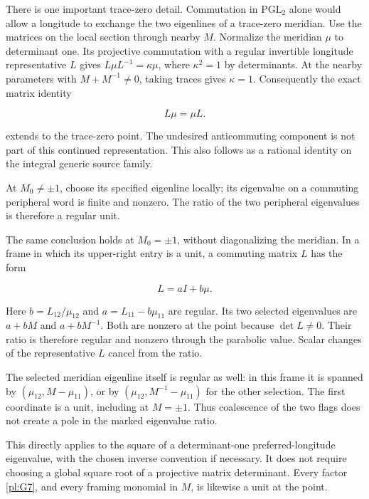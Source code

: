 There is one important trace-zero detail. Commutation in
\(\mathrm{PGL}_2\) alone would allow a longitude to
exchange the two eigenlines of a trace-zero meridian.
Use the matrices on the local section through nearby \(M\).
Normalize the meridian \(\mu\) to determinant one.
Its projective commutation with a regular invertible
longitude representative \(L\) gives
\(L\mu L^{-1}=\kappa\mu\), where
\(\kappa^2=1\) by determinants. At the nearby parameters
with \(M+M^{-1}\ne0\), taking traces gives \(\kappa=1\).
Consequently the exact matrix identity

\begin{equation}\label{pl:G16a}
L\mu=\mu L.
\end{equation}

extends to the trace-zero point. The undesired
anticommuting component is not part of this continued
representation. This also follows as a rational identity
on the integral generic source family.

At \(M_0\ne\pm1\), choose
its specified eigenline locally; its eigenvalue on a commuting
peripheral word is finite and nonzero. The ratio of the two
peripheral eigenvalues is therefore a regular unit.

The same conclusion holds at \(M_0=\pm1\), without
diagonalizing the meridian. In a frame in which its
upper-right entry is a unit, a commuting matrix \(L\) has
the form

\begin{equation}\label{pl:G17}
L=aI+b\mu.
\end{equation}

Here \(b=L_{12}/\mu_{12}\) and
\(a=L_{11}-b\mu_{11}\) are regular. Its two selected
eigenvalues are \(a+bM\) and \(a+bM^{-1}\). Both are
nonzero at the point because \(\det L\ne0\).
Their ratio is therefore regular and nonzero through the
parabolic value. Scalar changes of the representative \(L\)
cancel from the ratio.

The selected meridian eigenline itself is regular as well:
in this frame it is spanned by
\((\mu_{12},M-\mu_{11})\), or by
\((\mu_{12},M^{-1}-\mu_{11})\) for the other selection.
The first coordinate is a unit, including at \(M=\pm1\).
Thus coalescence of the two flags does not create a pole in
the marked eigenvalue ratio.

This directly applies to the square of a determinant-one
preferred-longitude eigenvalue, with the chosen inverse
convention if necessary. It does not require choosing a
global square root of a projective matrix determinant.
Every factor \eqref{pl:G7}, and every framing monomial in \(M\),
is likewise a unit at the point.

